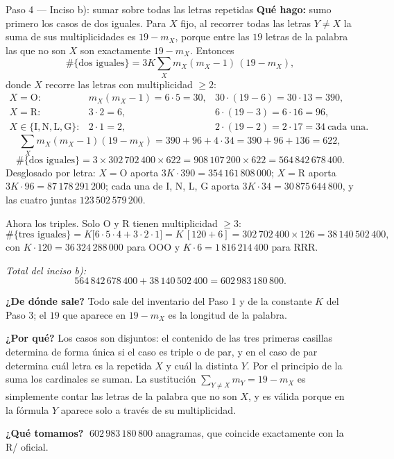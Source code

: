 \documentclass[11pt]{article}
\begin{document}
\begin{paso}{Paso 4 --- Inciso b): sumar sobre todas las letras repetidas}
\textbf{Qué hago:} sumo primero los casos de dos iguales. Para $X$ fijo, al recorrer todas las letras
$Y\neq X$ la suma de sus multiplicidades es $19-m_X$, porque entre las $19$ letras de la palabra las que no
son $X$ son exactamente $19-m_X$. Entonces
\[
\#\{\text{dos iguales}\}=3K\sum_{X} m_X(m_X-1)\,(19-m_X),
\]
donde $X$ recorre las letras con multiplicidad $\geq 2$:
\[
\begin{array}{lll}
X=\text{O}: & m_X(m_X-1)=6\cdot5=30, & 30\cdot(19-6)=30\cdot13=390,\\
X=\text{R}: & 3\cdot2=6, & 6\cdot(19-3)=6\cdot16=96,\\
X\in\{\text{I},\text{N},\text{L},\text{G}\}: & 2\cdot1=2, & 2\cdot(19-2)=2\cdot17=34 \ \text{cada una}.
\end{array}
\]
\[
\sum_X m_X(m_X-1)(19-m_X)=390+96+4\cdot34=390+96+136=622 ,
\]
\[
\#\{\text{dos iguales}\}=3\times302\,702\,400\times622=908\,107\,200\times622=564\,842\,678\,400 .
\]
Desglosado por letra: $X=$O aporta $3K\cdot390=354\,161\,808\,000$; $X=$R aporta
$3K\cdot96=87\,178\,291\,200$; cada una de I, N, L, G aporta $3K\cdot34=30\,875\,644\,800$, y las cuatro
juntas $123\,502\,579\,200$.

\medskip
Ahora los triples. Solo O y R tienen multiplicidad $\geq3$:
\[
\#\{\text{tres iguales}\}=K\big[6\cdot5\cdot4+3\cdot2\cdot1\big]=K\,[120+6]=302\,702\,400\times126=38\,140\,502\,400 ,
\]
con $K\cdot120=36\,324\,288\,000$ para OOO y $K\cdot6=1\,816\,214\,400$ para RRR.

\medskip
\emph{Total del inciso b):}
\[
564\,842\,678\,400+38\,140\,502\,400=602\,983\,180\,800 .
\]

\textbf{¿De dónde sale?} Todo sale del inventario del Paso 1 y de la constante $K$ del Paso 3; el $19$ que
aparece en $19-m_X$ es la longitud de la palabra.

\textbf{¿Por qué?} Los casos son disjuntos: el contenido de las tres primeras casillas determina de forma
única si el caso es triple o de par, y en el caso de par determina cuál letra es la repetida $X$ y cuál la
distinta $Y$. Por el principio de la suma los cardinales se suman. La sustitución
$\sum_{Y\neq X}m_Y=19-m_X$ es simplemente contar las letras de la palabra que no son $X$, y es válida
porque en la fórmula $Y$ aparece solo a través de su multiplicidad.

\textbf{¿Qué tomamos?} $\;602\,983\,180\,800$ anagramas, que coincide exactamente con la R/ oficial.
\end{paso}
\end{document}
